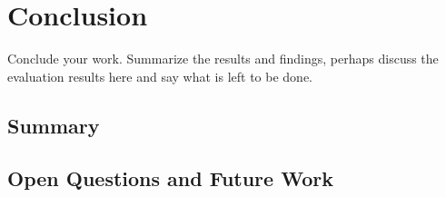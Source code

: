 
\chapter{Conclusion}\label{chap:conclusion}
	Conclude your work.
	Summarize the results and findings, perhaps discuss the evaluation results here and say what is left to be done.

	\section{Summary}\label{sec:summary}
		
		
	\section{Open Questions and Future Work}
	